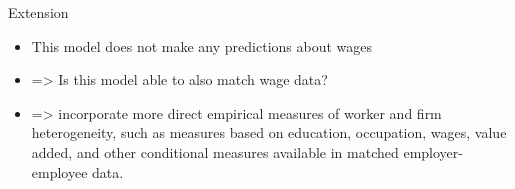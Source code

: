 \documentclass[10pt]{beamer}
\begin{document}
 


\begin{frame}{Extension}

\begin{itemize}
\item This model does not make any predictions about wages 
\item => Is this model able to also match wage data? 
\item => incorporate more direct empirical measures of worker and firm heterogeneity, such as measures based on education, occupation, wages, value added, and other conditional measures available in matched employer-employee data.
 
\end{itemize}

\end{frame}
 
 
\end{document}
